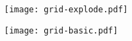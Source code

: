 \documentclass{article}
\begin{document}
\vspace*{-2cm}
\texttt{[image: grid-explode.pdf]}
\vspace*{1cm}

\texttt{[image: grid-basic.pdf]}
\end{document}
